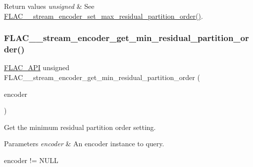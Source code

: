 \begin{DoxyRetVals}{Return values}
{\em unsigned} & See \hyperlink{group__flac__stream__encoder_ga6de153da5a8eeeb1be2271c27fa58b37}{F\+L\+A\+C\+\_\+\+\_\+stream\+\_\+encoder\+\_\+set\+\_\+max\+\_\+residual\+\_\+partition\+\_\+order()}. \\
\hline
\end{DoxyRetVals}
\mbox{\label{group__flac__stream__encoder_gace80859226b77f40b7b06314b26aa478}} 
\subsubsection{\texorpdfstring{F\+L\+A\+C\+\_\+\+\_\+stream\+\_\+encoder\+\_\+get\+\_\+min\+\_\+residual\+\_\+partition\+\_\+order()}{FLAC\_\_stream\_encoder\_get\_min\_residual\_partition\_order()}}
{\footnotesize\ttfamily \hyperlink{group__flac__export_ga56ca07df8a23310707732b1c0007d6f5}{F\+L\+A\+C\+\_\+\+A\+PI} unsigned F\+L\+A\+C\+\_\+\+\_\+stream\+\_\+encoder\+\_\+get\+\_\+min\+\_\+residual\+\_\+partition\+\_\+order (\begin{DoxyParamCaption}\item[{\hyperlink{zconf_8h_a2c212835823e3c54a8ab6d95c652660e}{const} \hyperlink{struct_f_l_a_c_____stream_encoder}{F\+L\+A\+C\+\_\+\+\_\+\+Stream\+Encoder} $\ast$}]{encoder }\end{DoxyParamCaption})}

Get the minimum residual partition order setting.


\begin{DoxyParams}{Parameters}
{\em encoder} & An encoder instance to query.  
\begin{DoxyCode}
encoder != NULL 
\end{DoxyCode}
 \\
\hline
\end{DoxyParams}

